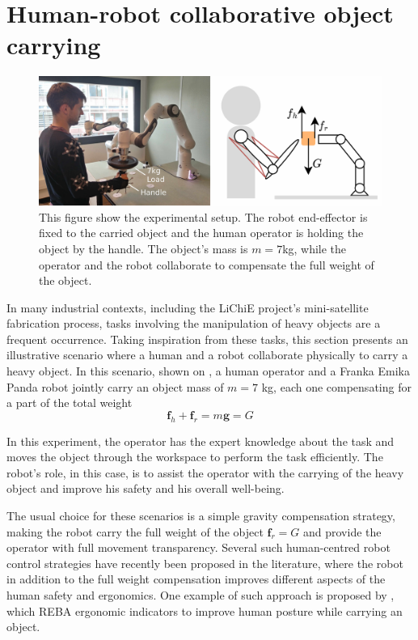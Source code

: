 \section{Human-robot collaborative object carrying}
\label{ch:human_robot_carrying}

\begin{figure}[!h]
    \centering
    \includegraphics[width=\linewidth]{Papers/images/exp2_real_schema.jpg}
    \caption{This figure show the experimental setup. The robot end-effector is fixed to the carried object and the human operator is holding the object by the handle. The object's mass is $m=7$kg, while the operator and the robot collaborate to compensate the full weight of the object.}
    \label{fig:exp2_real_schema}
\end{figure}

In many industrial contexts, including the LiChiE project's mini-satellite fabrication process, tasks involving the manipulation of heavy objects are a frequent occurrence. 
Taking inspiration from these tasks, this section presents an illustrative scenario where a human and a robot collaborate physically to carry a heavy object. In this scenario, shown on , a human operator and a {Franka Emika Panda} robot jointly carry an object mass of $m\!=\!7$ kg, each one compensating for a part of the total weight 
\begin{equation}
    \bm{f}_h  + \bm{f}_r = m\bm{g} = G
\end{equation}

In this experiment, the operator has the expert knowledge about the task and moves the object through the workspace to perform the task efficiently. The robot's role, in this case, is to assist the operator with the carrying of the heavy object and improve his safety and his overall well-being.

The usual choice for these scenarios is a simple gravity compensation strategy, making the robot carry the full weight of the object $\bm{f}_r = G$ and provide the operator with full movement transparency. Several such human-centred robot control strategies have recently been proposed in the literature, where the robot in addition to the full weight compensation improves different aspects of the human safety and ergonomics. One example of such approach is proposed by \citet{ferraguti2020unified}, which REBA \cite{reba} ergonomic indicators to improve human posture while carrying an object. 


